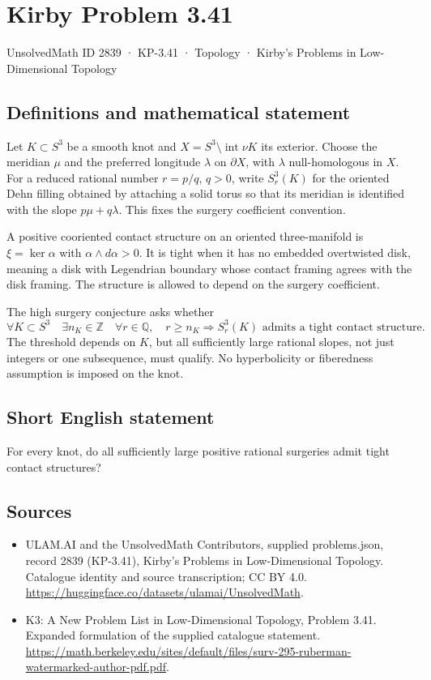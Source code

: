 \documentclass[11pt,a4paper]{article}
\begin{document}
\section*{Kirby Problem 3.41}\label{2839}
{\small UnsolvedMath ID 2839 · KP-3.41 · Topology · Kirby's Problems in Low-Dimensional Topology}
\subsection{Definitions and mathematical statement}
Let $K\subset S^3$ be a smooth knot and $X=S^3\setminus\operatorname{int}\nu K$
its exterior. Choose the meridian $\mu$ and the preferred longitude $\lambda$
on $\partial X$, with $\lambda$ null-homologous in $X$. For a reduced rational
number $r=p/q$, $q>0$, write $S^3_r(K)$ for the oriented Dehn filling
obtained by attaching a solid torus so that its meridian is identified with
the slope $p\mu+q\lambda$. This fixes the surgery coefficient convention.

A positive cooriented contact structure on an oriented three-manifold is
$\xi=\ker\alpha$ with $\alpha\wedge d\alpha>0$. It is tight when it has
no embedded overtwisted disk, meaning a disk with Legendrian boundary whose
contact framing agrees with the disk framing. The structure is allowed to
depend on the surgery coefficient.

The high surgery conjecture asks whether
\[
 \forall K\subset S^3\quad\exists n_K\in\mathbb Z\quad
 \forall r\in\mathbb Q,
 \quad r\geq n_K\Longrightarrow
 S^3_r(K)\text{ admits a tight contact structure}.
\]
The threshold depends on $K$, but all sufficiently large rational slopes,
not just integers or one subsequence, must qualify. No hyperbolicity or
fiberedness assumption is imposed on the knot.
\subsection{Short English statement}
For every knot, do all sufficiently large positive rational surgeries admit tight contact structures?
\subsection{Sources}
\begin{itemize}
\item[S1] ULAM.AI and the UnsolvedMath Contributors, supplied problems.json, record 2839 (KP-3.41), Kirby's Problems in Low-Dimensional Topology. Catalogue identity and source transcription; CC BY 4.0.
\url{https://huggingface.co/datasets/ulamai/UnsolvedMath}.
\item[S2] K3: A New Problem List in Low-Dimensional Topology, Problem 3.41. Expanded formulation of the supplied catalogue statement.
\url{https://math.berkeley.edu/sites/default/files/surv-295-ruberman-watermarked-author-pdf.pdf}.
\end{itemize}
\end{document}

